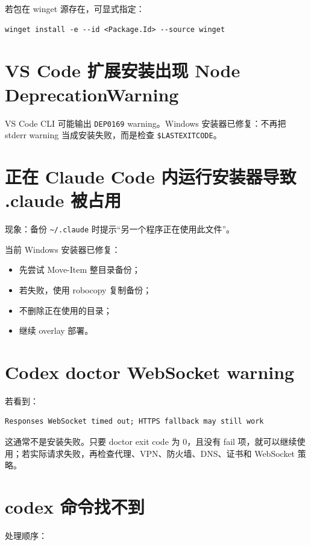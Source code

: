 \documentclass[11pt,a4paper]{ctexbook}
\begin{document}
若包在 winget 源存在，可显式指定：

\begin{lstlisting}[language={}]
winget install -e --id <Package.Id> --source winget
\end{lstlisting}

\section{VS Code 扩展安装出现 Node DeprecationWarning}

VS Code CLI 可能输出 \texttt{DEP0169} warning。Windows 安装器已修复：不再把 stderr warning 当成安装失败，而是检查 \texttt{\$LASTEXITCODE}。

\section{正在 Claude Code 内运行安装器导致 .claude 被占用}

现象：备份 \texttt{\textasciitilde/.claude} 时提示“另一个程序正在使用此文件”。

当前 Windows 安装器已修复：

\begin{itemize}[leftmargin=2em]
  \item 先尝试 Move-Item 整目录备份；
  \item 若失败，使用 robocopy 复制备份；
  \item 不删除正在使用的目录；
  \item 继续 overlay 部署。
\end{itemize}

\section{Codex doctor WebSocket warning}

若看到：

\begin{lstlisting}[language={}]
Responses WebSocket timed out; HTTPS fallback may still work
\end{lstlisting}

这通常不是安装失败。只要 doctor exit code 为 0，且没有 fail 项，就可以继续使用；若实际请求失败，再检查代理、VPN、防火墙、DNS、证书和 WebSocket 策略。

\section{codex 命令找不到}

处理顺序：
\end{document}
